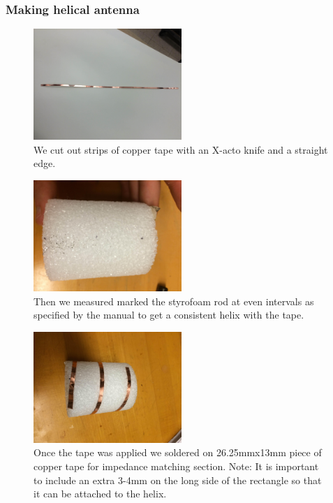 \documentclass[11pt]{article} %
\begin{document}
\subsubsection{Making helical antenna}



\begin{figure}
  \centering
  \caption{ We cut out strips of copper tape with an X-acto knife and a straight edge.  }
  \includegraphics[width=0.50\textwidth]{feed/09.jpeg}
\end{figure}



\begin{figure}
  \centering
  \caption{ Then we measured marked the styrofoam rod at even intervals as specified by the manual to get a consistent helix with the tape.  }
  \includegraphics[width=0.50\textwidth]{feed/10.jpeg}
\end{figure}

\begin{figure}
  \centering
  \caption{ Once the tape was applied we soldered on 26.25mmx13mm piece of copper tape for impedance matching section. Note: It is important to include an extra 3-4mm on the long side of the rectangle so that it can be attached to the helix.  }
  \includegraphics[width=0.50\textwidth]{feed/11.jpeg}
\end{figure}
\end{document}
